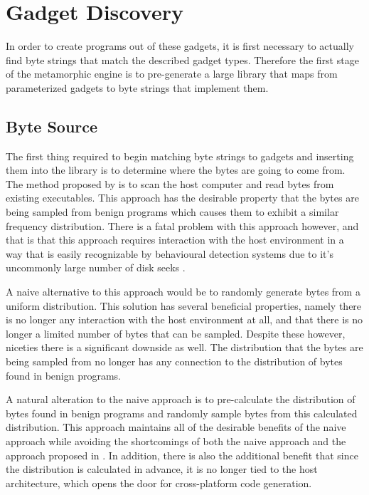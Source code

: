     \section{Gadget Discovery}

    In order to create programs out of these gadgets, it is first necessary to
    actually find byte strings that match the described gadget types. Therefore
    the first stage of the metamorphic engine is to pre-generate a large library
    that maps from parameterized gadgets to byte strings that implement them.

    \subsection{Byte Source}

    The first thing required to begin matching byte strings to gadgets and
    inserting them into the library is to determine where the bytes are going to
    come from. The method proposed by \cite{franken} is to scan the host
    computer and read bytes from existing executables. This approach has the
    desirable property that the bytes are being sampled from benign programs
    which causes them to exhibit a similar frequency distribution.  There is a
    fatal problem with this approach however, and that is that this approach
    requires interaction with the host environment in a way that is easily
    recognizable by behavioural detection systems due to it's uncommonly large
    number of disk seeks \cite{anon-evade}.

    A naive alternative to this approach would be to randomly generate bytes
    from a uniform distribution. This solution has several beneficial
    properties, namely there is no longer any interaction with the host
    environment at all, and that there is no longer a limited number of bytes
    that can be sampled. Despite these however, niceties there is a significant
    downside as well. The distribution that the bytes are being sampled from no
    longer has any connection to the distribution of bytes found in benign
    programs.

    A natural alteration to the naive approach is to pre-calculate the
    distribution of bytes found in benign programs and randomly sample bytes
    from this calculated distribution. This approach maintains all of the
    desirable benefits of the naive approach while avoiding the shortcomings of
    both the naive approach and the approach proposed in \cite{franken}. In
    addition, there is also the additional benefit that since the distribution
    is calculated in advance, it is no longer tied to the host architecture,
    which opens the door for cross-platform code generation.

